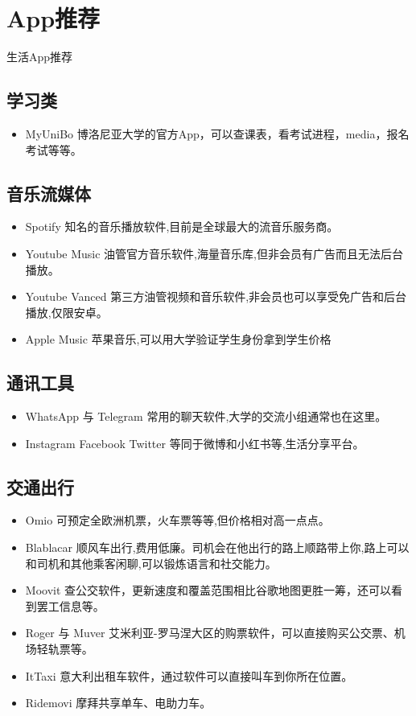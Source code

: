 \section{App推荐}
生活App推荐

\subsection{学习类}
\begin{itemize}
\item MyUniBo  博洛尼亚大学的官方App，可以查课表，看考试进程，media，报名考试等等。
\end{itemize}

\subsection{音乐流媒体}
\begin{itemize}
\item Spotify  知名的音乐播放软件,目前是全球最大的流音乐服务商。
\item Youtube Music  油管官方音乐软件,海量音乐库,但非会员有广告而且无法后台播放。
\item Youtube Vanced 第三方油管视频和音乐软件,非会员也可以享受免广告和后台播放,仅限安卓。
\item Apple Music 苹果音乐,可以用大学验证学生身份拿到学生价格
\end{itemize}

\subsection{通讯工具}
\begin{itemize}
\item WhatsApp 与 Telegram 常用的聊天软件,大学的交流小组通常也在这里。
\item Instagram  Facebook Twitter 等同于微博和小红书等,生活分享平台。
\end{itemize}

\subsection{交通出行}
\begin{itemize}
\item Omio  可预定全欧洲机票，火车票等等,但价格相对高一点点。 
\item Blablacar 顺风车出行,费用低廉。司机会在他出行的路上顺路带上你,路上可以和司机和其他乘客闲聊,可以锻炼语言和社交能力。
\item Moovit  查公交软件，更新速度和覆盖范围相比谷歌地图更胜一筹，还可以看到罢工信息等。
\item Roger 与 Muver  艾米利亚-罗马涅大区的购票软件，可以直接购买公交票、机场轻轨票等。
\item ItTaxi  意大利出租车软件，通过软件可以直接叫车到你所在位置。
\item Ridemovi  摩拜共享单车、电助力车。
\end{itemize}

